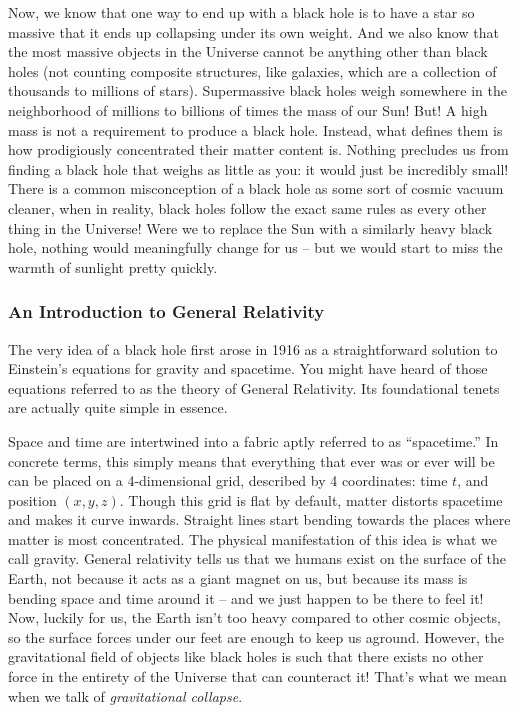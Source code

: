 Now, we know that one way to end up with a black hole is to have a star so massive that it ends up collapsing under its own weight. And we also know that the most massive objects in the Universe cannot be anything other than black holes (not counting composite structures, like galaxies, which are a collection of thousands to millions of stars). Supermassive black holes weigh somewhere in the neighborhood of millions to billions of times the mass of our Sun! But! A high mass is not a requirement to produce a black hole. Instead, what defines them is how prodigiously concentrated their matter content is. Nothing precludes us from finding a black hole that weighs as little as you: it would just be incredibly small! There is a common misconception of a black hole as some sort of cosmic vacuum cleaner, when in reality, black holes follow the exact same rules as every other thing in the Universe! Were we to replace the Sun with a similarly heavy black hole, nothing would meaningfully change for us -- but we would start to miss the warmth of sunlight pretty quickly.


\subsubsection{An Introduction to General Relativity}
The very idea of a black hole first arose in 1916 as a straightforward solution to Einstein's equations for gravity and spacetime. You might have heard of those equations referred to as the theory of General Relativity. Its foundational tenets are actually quite simple in essence.

Space and time are intertwined into a fabric aptly referred to as ``spacetime.'' In concrete terms, this simply means that everything that ever was or ever will be can be placed on a 4-dimensional grid, described by 4 coordinates: time $t$, and position $(x, y, z)$. 
Though this grid is flat by default, matter distorts spacetime and makes it curve inwards. Straight lines start bending towards the places where matter is most concentrated. The physical manifestation of this idea is what we call gravity. General relativity tells us that we humans exist on the surface of the Earth, not because it acts as a giant magnet on us, but because its mass is bending space and time around it -- and we just happen to be there to feel it! Now, luckily for us, the Earth isn't too heavy compared to other cosmic objects, so the surface forces under our feet are enough to keep us aground. However, the gravitational field of objects like black holes is such that there exists no other force in the entirety of the Universe that can counteract it! That's what we mean when we talk of \textit{gravitational collapse}.


